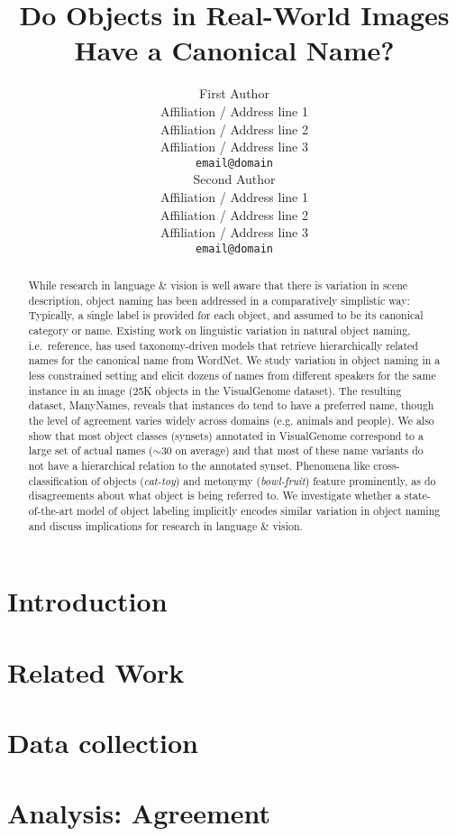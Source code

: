 \documentclass[11pt,a4paper]{article}
\title{Do Objects in Real-World Images Have a Canonical Name?}
\author{First Author \\
  Affiliation / Address line 1 \\
  Affiliation / Address line 2 \\
  Affiliation / Address line 3 \\
  {\tt email@domain} \\\And
  Second Author \\
  Affiliation / Address line 1 \\
  Affiliation / Address line 2 \\
  Affiliation / Address line 3 \\
  {\tt email@domain} \\}
\date{}
\begin{document}
\maketitle

\begin{abstract}
While research in language \& vision is well aware that there is variation in scene description, object naming has been addressed in a comparatively simplistic way: 
Typically, a single label is provided for each object, and assumed to be its canonical category or name.
Existing work on linguistic variation in natural object naming, i.e.\ reference, has used taxonomy-driven models that retrieve hierarchically related names for the canonical name from WordNet. 
We study variation in object naming in a less constrained setting and elicit dozens of names from different speakers for the same instance in an image (25K objects in the VisualGenome dataset).
The resulting dataset, ManyNames, reveals that instances do tend to have a preferred name, though the level of agreement varies widely across domains (e.g. animals and people).
 We also show that most object classes (synsets) annotated in VisualGenome correspond to a large set of actual names ($\sim$30 on average) and that most of these name variants do not have a hierarchical relation to the annotated synset.
 Phenomena like cross-classification of objects (\textit{cat-toy}) and metonymy (\textit{bowl-fruit}) feature prominently, as do disagreements about what object is being referred to.
 We investigate whether a state-of-the-art model of object labeling implicitly encodes similar variation in object naming and discuss implications for research in language \& vision.
\end{abstract}

\section{Introduction}


\section{Related Work}
\label{sec:relwork}
%

\section{Data collection}
\label{sec:data}


\section{Analysis: Agreement}
\label{sec:analysis}

\end{document}
